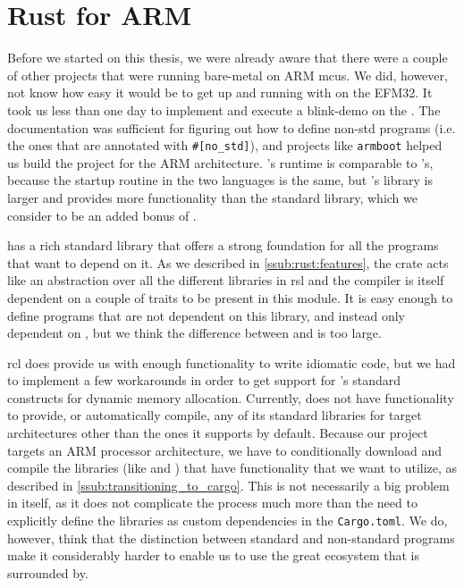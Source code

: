 
\section{Rust for ARM} %
\label{sec:disc:rust_for_arm}

Before we started on this thesis, we were already aware that there were a couple of other projects that were running {\rust} bare-metal on ARM \glspl{mcu}.
We did, however, not know how easy it would be to get up and running with {\rust} on the EFM32.
It took us less than one day to implement and execute a {\rust} blink-demo on the {\STK}.
The {\rust} documentation was sufficient for figuring out how to define non-std {\rust} programs (i.e. the ones that are annotated with \texttt{\#[no\_std]}), and projects like \texttt{armboot} helped us build the project for the ARM architecture.
{\rust}'s runtime is comparable to {\C}'s, because the startup routine in the two languages is the same, but {\rust}'s {\core} library is larger and provides more functionality than the {\C} standard library, which we consider to be an added bonus of {\rust}.

{\rust} has a rich standard library that offers a strong foundation for all the programs that want to depend on it.
As we described in \autoref{ssub:rust:features}, the {\std} crate acts like an abstraction over all the different libraries in \gls{rsl} and the {\rustc} compiler is itself dependent on a couple of traits to be present in this module.
It is easy enough to define programs that are not dependent on this {\std} library, and instead only dependent on {\core}, but we think the difference between {\std} and {\core} is too large.

\gls{rcl} does provide us with enough functionality to write idiomatic {\rust} code, but we had to implement a few workarounds in order to get support for {\rust}'s standard constructs for dynamic memory allocation.
Currently, {\rust} does not have functionality to provide, or automatically compile, any of its standard libraries for target architectures other than the ones it supports by default.
Because our project targets an ARM processor architecture, we have to conditionally download and compile the libraries (like  and ) that have functionality that we want to utilize, as described in \autoref{ssub:transitioning_to_cargo}.
This is not necessarily a big problem in itself, as it does not complicate the process much more than the need to explicitly define the libraries as custom dependencies in the \texttt{Cargo.toml}.
We do, however, think that the distinction between standard and non-standard programs make it considerably harder to enable us to use the great ecosystem that {\rust} is surrounded by.

